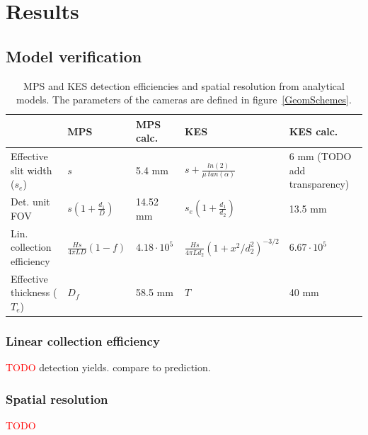 \documentclass[a4paper,english]{article}
\begin{document}


\section{Results}

\subsection{Model verification}

\begin{table}
\centering
\begin{tabular}{lllll}
	\midrule
	                            & MPS & MPS calc. & KES & KES calc. \\
	\midrule
	Effective slit width ($s_e$)& $s$                              & 5.4 mm
	 & $s + \frac{ln(2)}{\mu~tan(\alpha)}$                         & 6 mm (TODO add transparency) \\
 	Det. unit FOV               & $s(1+\frac{d_1}{D})$             & 14.52 mm
 	 & $s_e(1+\frac{d_1}{d_2})$                                    & 13.5 mm\\
 	Lin. collection efficiency  & $\frac{H s}{ 4 \pi L D } (1-f) $ & $4.18 \cdot 10^5$
 	 & $\frac{H s}{ 4 \pi L d_2 } (1 + x^2/d^2_2)^{-3/2} $         & $6.67 \cdot 10^5$ \\
 	Effective thickness ($T_e$) & $D_f$                            & 58.5 mm
 	 & $T$                                                         & 40 mm\\
	\midrule
\end{tabular}
\caption{MPS and KES detection efficiencies and spatial resolution from analytical models. The parameters of the cameras are defined in figure~\ref{GeomSchemes}.}
\label{GeomFormulas}
\end{table}

\subsubsection{Linear collection efficiency}
\textcolor{red}{TODO} detection yields. compare to prediction.
\subsubsection{Spatial resolution}
\textcolor{red}{TODO}
\end{document}
